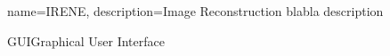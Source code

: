 %

{
  name=IRENE,
  description={Image Reconstruction blabla description}
}

{GUI}{Graphical User Interface}